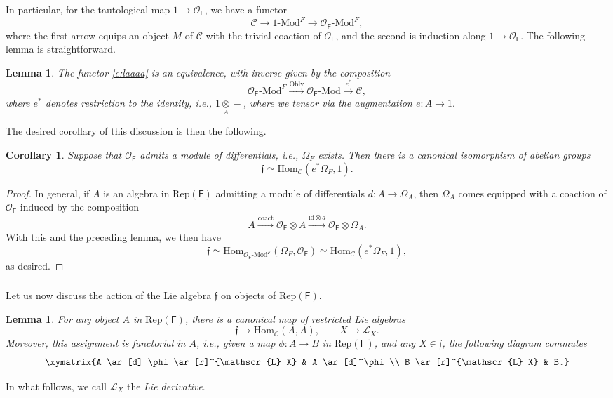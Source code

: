 \documentclass{amsart}
\newtheorem{Cor}[Thm]{Corollary}
\newtheorem{Lem}[Thm]{Lemma}
\theoremstyle{definition}
\newcommand{\RepF}{\Rep(\mathsf{F})}
\newcommand{\OOF}{\OO_{\mathsf{F}}}
\newcommand{\Rep}{\on{Rep}}
\newcommand{\Oblv}{\on{Oblv}}
\newcommand{\sC}{\mathscr{C}}
\newcommand{\sss}{\subsubsection{}}
\newcommand{\OO}{\mathscr{O}}
\newcommand{\Hom}{\on{Hom}}
\renewcommand{\mod}{\text{-}\on{Mod}}
\newcommand{\on}{\mathrm}
\newcommand{\ff}{\mathfrak{f}}
\numberwithin{equation}{section}
\begin{document}
In particular, for the tautological map $1 \rightarrow \OOF$, we have a functor
\begin{equation}\label{e:laaaa}\sC \rightarrow 1\mod^F \rightarrow \OOF\mod^F,\end{equation}
where the first arrow equips an object $M$ of $\sC$ with the trivial coaction of $\OOF$, and the second is induction along $1 \rightarrow \OOF$. The following lemma is straightforward. 

\begin{Lem} \label{l:HmodH}The functor \eqref{e:laaaa} is an equivalence, with inverse given by the composition
$$\OOF\mod^F \xrightarrow{\Oblv} \OOF\mod \xrightarrow{e^*} \sC,$$where $e^*$ denotes restriction to the identity, i.e., $1 \underset{A} \otimes -$, where we tensor via the augmentation $e: A \rightarrow 1.$
\end{Lem}

The desired corollary of this discussion is then the following. 

\begin{Cor} Suppose that $\OOF$ admits a module of differentials, i.e., $\Omega_F$ exists. Then there is a canonical isomorphism of abelian groups
$$\ff \simeq \Hom_{\sC}( e^* \Omega_F, 1).$$  
\end{Cor}

\begin{proof} In general, if $A$ is an algebra in $\RepF$ admitting a module of differentials $d: A \rightarrow \Omega_A$,  then $\Omega_A$ comes equipped with a coaction of $\OOF$ induced by the composition
$$A \xrightarrow{\on{coact}} \OOF \otimes A \xrightarrow{\on{id} \otimes d} \OOF \otimes \Omega_A.$$
With this and the preceding lemma, we then have 
$$\ff \simeq \Hom_{\OOF\mod^F}(\Omega_F, \OOF) \simeq \Hom_{\sC}( e^* \Omega_F, 1),$$as desired. 
\end{proof}\fi 


\sss Let us now discuss the action of the Lie algebra $\ff$ on objects of $\RepF$. 

{
\begin{Lem}\label{l:derivaction} For any object $A$ in $\RepF$, there is a canonical map of restricted Lie algebras
$$\ff \rightarrow \on{Hom}_{\sC}(A,A), \quad \quad X \mapsto \mathscr{L}_X.$$Moreover, this assignment is functorial in $A$, i.e., given a map $\phi: A \rightarrow B$ in  $\RepF$, and any $X \in \ff$, the following diagram commutes
$$\xymatrix{A \ar[d]_\phi \ar[r]^{\mathscr{L}_X} & A \ar[d]^\phi \\ B \ar[r]^{\mathscr{L}_X}  & B.}$$    
\end{Lem}
}
In what follows, we call $\mathscr{L}_X$ the {\it Lie derivative}. 
\end{document}
